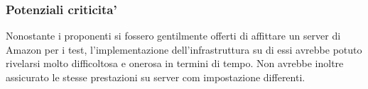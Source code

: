 \subsubsection{Potenziali criticita'} 
Nonostante i proponenti si fossero gentilmente offerti di affittare un server di Amazon per i test, l’implementazione dell’infrastruttura su di essi avrebbe potuto rivelarsi molto difficoltosa e onerosa in termini di tempo. Non avrebbe inoltre assicurato le stesse prestazioni su server com impostazione differenti.

